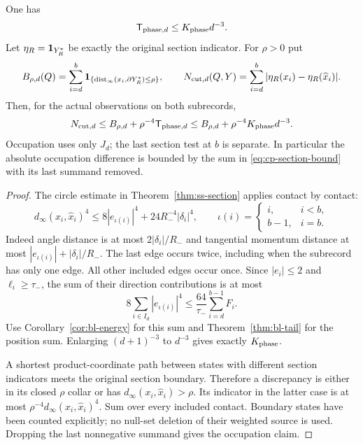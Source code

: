 \begin{theorem}
\label{thm:cp-phase}
One has
\begin{equation}\label{eq:cp-phase-bound}
 \mathsf T_{{\rm phase},d}\le K_{\rm phase}d^{-3}.
\end{equation}
Let $\eta_R=\mathbf1_{Y_R^*}$ be exactly the original section indicator.
For $\rho>0$ put
\[
 B_{\rho,d}(Q)=\sum_{i=d}^b
       \mathbf1_{\{\operatorname{dist}_\infty(x_i,\partial Y_R^*)\le\rho\}},
 \qquad
 N_{{\rm cut},d}(Q,Y)=\sum_{i=d}^b|\eta_R(x_i)-\eta_R(\widehat x_i)|.
\]
Then, for the actual observations on both subrecords,
\begin{equation}\label{eq:cp-section-bound}
 N_{{\rm cut},d}
 \le B_{\rho,d}+\rho^{-4}\mathsf T_{{\rm phase},d}
 \le B_{\rho,d}+\rho^{-4}K_{\rm phase}d^{-3}.
\end{equation}
Occupation uses only $J_d$; the last section test at $b$ is separate.
In particular the absolute occupation difference is bounded by the
sum in \eqref{eq:cp-section-bound} with its last summand removed.
\end{theorem}
\begin{proof}
The circle estimate in Theorem~\ref{thm:ss-section} applies contact
by contact:
\[
 d_\infty(x_i,\widehat x_i)^4
 \le 8|e_{\iota(i)}|^4+24R_-^{-4}|\delta_i|^4,\qquad
 \iota(i)=
 \begin{cases}i,&i<b,\\ b-1,&i=b.\end{cases}
\]
Indeed angle distance is at most $2|\delta_i|/R_-$ and tangential
momentum distance at most $|e_{\iota(i)}|+|\delta_i|/R_-$.
The last edge occurs twice, including when the subrecord has only
one edge.  All other included edges occur once.  Since $|e_i|\le2$
and $\ell_i\ge\tau_-$, the sum of their direction contributions is
at most
\[
 8\sum_{i\in I_d}|e_{\iota(i)}|^4
                  \le\frac{64}{\tau_-}\sum_{i=d}^{b-1}F_i .
\]
Use Corollary~\ref{cor:bl-energy} for this sum and
Theorem~\ref{thm:bl-tail} for the position sum.  Enlarging
$(d+1)^{-3}$ to $d^{-3}$ gives exactly $K_{\rm phase}$.

A shortest product-coordinate path between states with different
section indicators meets the original section boundary.  Therefore
a discrepancy is either in its closed $\rho$ collar or has
$d_\infty(x_i,\widehat x_i)>\rho$.  Its indicator in the latter
case is at most $\rho^{-4}d_\infty(x_i,\widehat x_i)^4$.
Sum over every included contact.  Boundary states have been counted
explicitly; no null-set deletion of their weighted source is used.
Dropping the last nonnegative summand gives the occupation claim.
\end{proof}


